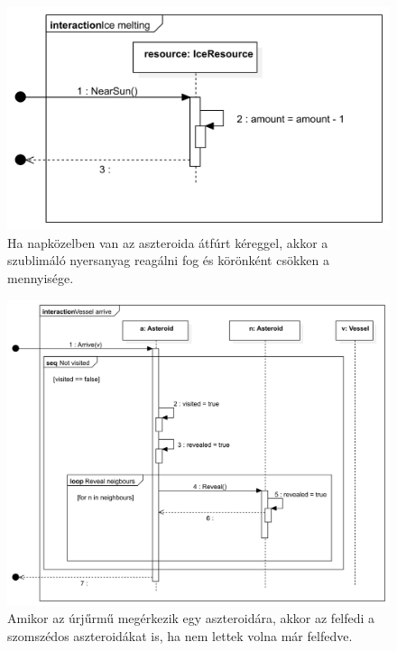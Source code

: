 \begin{figure}[H] 
\centering 
\includegraphics[width=1\textwidth]{docs/3_Project/svg/Design Model!Sun Distance!Ice melting!Ice melting_8.png} 
\caption{Ha napközelben van az aszteroida átfúrt kéreggel, akkor a szublimáló nyersanyag reagálni fog és körönként csökken a mennyisége.} 
\end{figure} 

\begin{figure}[H] 
\centering 
\includegraphics[width=1\textwidth]{docs/3_Project/svg/Design Model!Vessel Actions!Vessel arrive!Vessel arrive_9.png} 
\caption{Amikor az úrjűrmű megérkezik egy aszteroidára, akkor az felfedi a szomszédos aszteroidákat is, ha nem lettek volna már felfedve.} 
\end{figure} 

